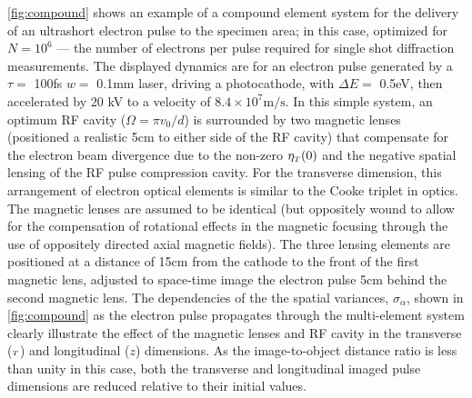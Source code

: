 \ref{fig:compound} shows an example of a compound element system for the delivery of an ultrashort electron pulse to the specimen area; in this case, optimized for $ N = 10^{ 6 } $ --- the number of electrons per pulse required for single shot diffraction measurements.\cite{armstrong_practical_2007}
The displayed dynamics are for an electron pulse generated by a $\tau = $ 100fs $w = $ 0.1mm laser, driving a photocathode, with $\Delta E = $ 0.5eV, then accelerated by 20 kV to a velocity of $8.4 \times 10^{7} \text{m}/\text{s}$.
In this simple system, an optimum RF cavity ($ \Omega = \pi v_{{ \scriptscriptstyle 0}} / d $) is surrounded by two magnetic lenses (positioned a realistic 5cm to either side of the RF cavity) that compensate for the electron beam divergence due to the non-zero $ \eta_{{\scriptscriptstyle T}} (0) $ and the negative spatial lensing of the RF pulse compression cavity.
For the transverse dimension, this arrangement of electron optical elements is similar to the Cooke triplet in optics.
The magnetic lenses are assumed to be identical (but oppositely wound to allow for the compensation of rotational effects in the magnetic focusing through the use of oppositely directed axial magnetic fields).
The three lensing elements are positioned at a distance of 15cm from the cathode to the front of the first magnetic lens, adjusted to space-time image the electron pulse 5cm behind the second magnetic lens.
The dependencies of the the spatial variances, $\sigma_{\alpha}$, shown in \ref{fig:compound} as the electron pulse propagates through the multi-element system clearly illustrate the effect of the magnetic lenses and RF cavity in the transverse (${\scriptscriptstyle T}$) and longitudinal ($z$) dimensions.
As the image-to-object distance ratio is less than unity in this case, both the transverse and longitudinal imaged pulse dimensions are reduced relative to their initial values. %

